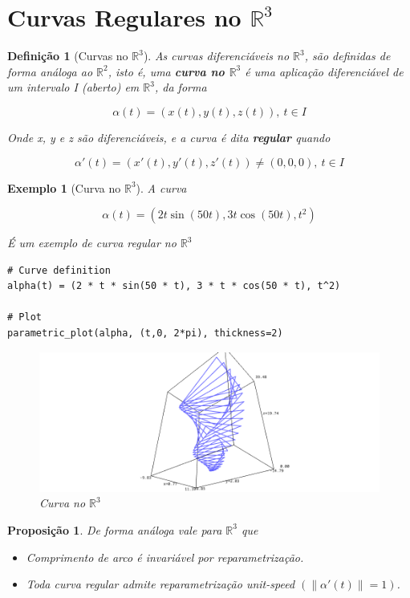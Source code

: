 \documentclass[12pt]{article}
\newtheorem{prop}{Proposição}
\newtheorem{ex}{Exemplo}[section]
\newtheorem{definition}{Definição}
\begin{document}
\section{Curvas Regulares no $\mathbb{R}^3$}\label{s5}
\begin{definition}[Curvas no $\mathbb{R}^3$]
As curvas diferenciáveis no $\mathbb{R}^3$, são definidas de forma análoga ao $\mathbb{R}^2$, isto é, uma \textbf{curva no $\mathbb{R}^3$} é uma aplicação diferenciável de um intervalo I (aberto) em $\mathbb{R}^3$, da forma

$$\alpha(t) = (x(t), y(t), z(t)),\ t \in I$$

Onde x, y e z são diferenciáveis, e a curva é dita \textbf{regular} quando

$$\alpha'(t) = (x'(t), y'(t), z'(t)) \neq (0, 0, 0),\ t \in I$$
\end{definition}

\begin{ex}[Curva no $\mathbb{R}^3$] A curva

$$\alpha(t) = (2 t \sin(50 t), 3 t \cos(50 t), t^2)$$

É um exemplo de curva regular no $\mathbb{R}^3$

\begin{lstlisting}
# Curve definition
alpha(t) = (2 * t * sin(50 * t), 3 * t * cos(50 * t), t^2)

# Plot
parametric_plot(alpha, (t,0, 2*pi), thickness=2)
\end{lstlisting}

\begin{figure}[H]
    \centering
    \includegraphics[scale=.5]{Images/ex5.1.png}
    \caption{Curva no $\mathbb{R}^3$}
    \label{fig:ex5.1}
\end{figure}
\end{ex}

\begin{prop} De forma análoga vale para $\mathbb{R}^3$ que
\begin{itemize}
    \item Comprimento de arco é invariável por reparametrização.
    
    \item Toda curva regular admite reparametrização \textit{unit-speed} $(\| \alpha'(t) \| = 1)$.
\end{itemize}
\end{prop}
\end{document}
